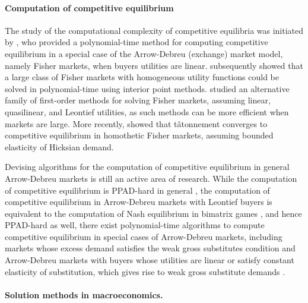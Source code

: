 \paragraph{Computation of competitive equilibrium}
The study of the computational complexity of competitive equilibria was initiated by \citet{devanur2002market}, who provided a polynomial-time method for computing competitive equilibrium in a special case of the Arrow-Debreu (exchange) market model, namely Fisher markets, when buyers utilities are linear.
\citet{jain2005market} subsequently showed that a large class of Fisher markets with homogeneous utility functions could be solved in polynomial-time using interior point methods.
\citet{gao2020polygm} studied an alternative family of first-order methods for solving Fisher markets, assuming linear, quasilinear, and Leontief utilities, as such methods can be more efficient when markets are large. 
More recently, \citet{goktas2023tatonn} showed that t\^atonnement converges to competitive equilibrium in homothetic Fisher markets, assuming bounded elasticity of Hicksian demand.

Devising algorithms for the computation of competitive equilibrium in general Arrow-Debreu markets is still an active area of research.
While the computation of competitive equilibrium is PPAD-hard in general \cite{chen2006settling, daskalakis2009complexity}, the computation of competitive equilibrium in Arrow-Debreu markets with Leontief buyers is equivalent to the computation of Nash equilibrium in bimatrix games \cite{codenotti2006leontief, deng2008computation}, and hence PPAD-hard as well, there exist polynomial-time algorithms to compute competitive equilibrium in special cases of Arrow-Debreu markets, including markets whose excess demand satisfies the weak gross substitutes condition \cite{codenotti2005market, bei2015tatonnement} and Arrow-Debreu markets with buyers whose utilities are linear \cite{garg2004auction, branzei2021proportional} or satisfy constant elasticity of substitution, which gives rise to weak gross substitute demands \cite{branzei2021proportional}.



\paragraph{Solution methods in macroeconomics.}

